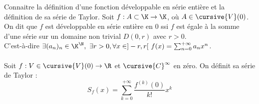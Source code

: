\documentclass[french, 11pt]{article}
\begin{document}
\begin{exercice}{}{}
    Connaitre la définition d'une fonction développable en série entière et la définition de sa série de Taylor.
    \tcblower
    Soit $f:A\subset \K \to \K$, où $A\in\cursive{V}(0)$. On dit que $f$ est développable en série entière en $0$ ssi $f$ est égale à la somme d'une série sur un domaine non trivial $D(0,r)$ avec $r>0$.\\
    C'est-à-dire $\exists (a_n)_n \in \K^\N, ~ \exists r > 0, \forall x \in ]-r,r[ ~ f(x)=\sum_{n=0}^{+\infty} a_nx^n$.\\
    \\
    Soit $f:V\in\cursive{V}(0)\to\R$ et $\cursive{C}^\infty$ en zéro. On définit sa série de Taylor :
    \begin{equation*}
        S_f(x) = \sum_{k=0}^{+\infty}\frac{f^{(k)}(0)}{k!}x^k
    \end{equation*}
\end{exercice}
\end{document}
